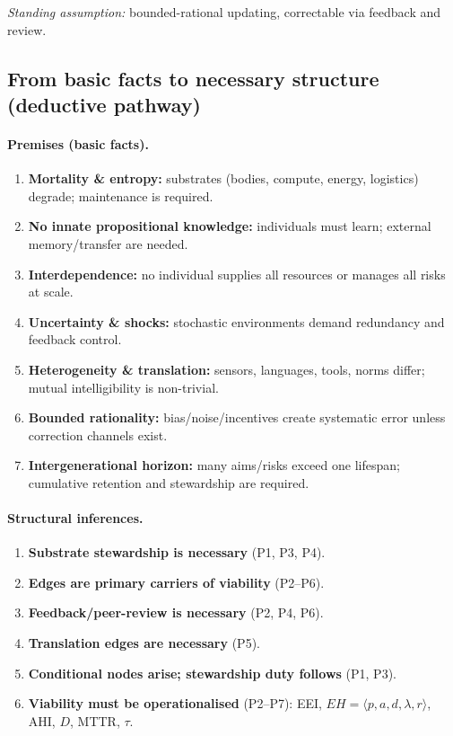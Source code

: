 \documentclass[12pt]{article}
\begin{document}
\emph{Standing assumption:} bounded-rational updating, correctable via feedback and review.

\subsection{From basic facts to necessary structure (deductive pathway)}
\paragraph{Premises (basic facts).}
\begin{enumerate}
\item \textbf{Mortality \& entropy:} substrates (bodies, compute, energy, logistics) degrade; maintenance is required.
\item \textbf{No innate propositional knowledge:} individuals must learn; external memory/transfer are needed.
\item \textbf{Interdependence:} no individual supplies all resources or manages all risks at scale.
\item \textbf{Uncertainty \& shocks:} stochastic environments demand redundancy and feedback control.
\item \textbf{Heterogeneity \& translation:} sensors, languages, tools, norms differ; mutual intelligibility is non-trivial.
\item \textbf{Bounded rationality:} bias/noise/incentives create systematic error unless correction channels exist.
\item \textbf{Intergenerational horizon:} many aims/risks exceed one lifespan; cumulative retention and stewardship are required.
\end{enumerate}

\paragraph{Structural inferences.}
\begin{enumerate}
\item \textbf{Substrate stewardship is necessary} (P1, P3, P4).
\item \textbf{Edges are primary carriers of viability} (P2--P6).
\item \textbf{Feedback/peer-review is necessary} (P2, P4, P6).
\item \textbf{Translation edges are necessary} (P5).
\item \textbf{Conditional nodes arise; stewardship duty follows} (P1, P3).
\item \textbf{Viability must be operationalised} (P2--P7): EEI, $EH=\langle p,a,d,\lambda,r\rangle$, AHI, $D$, MTTR, $\tau$.
\end{enumerate}
\end{document}
